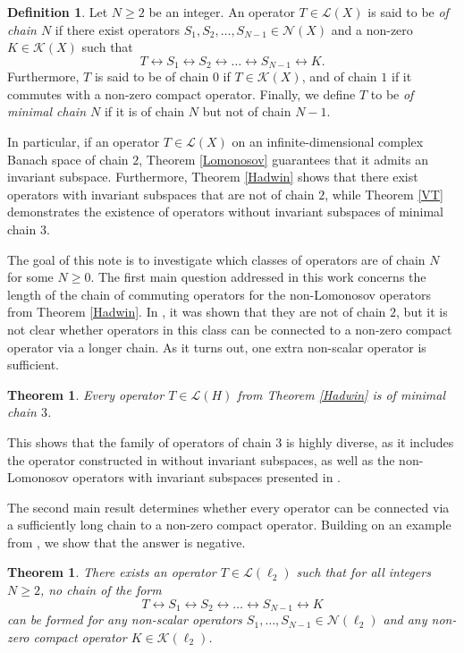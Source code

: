 \documentclass[a4paper,12pt]{article}
\newtheorem{theorem}[thm]{Theorem}
\theoremstyle{definition}
\newtheorem{definition}[thm]{Definition}
\numberwithin{equation}{section}
\numberwithin{thm}{section}
\begin{document}
\begin{definition}
Let $N\geq 2$ be an integer. An operator $T \in \mathcal{L}(X)$ is said to be \textit{of chain $N$} if there exist operators $S_1,S_2,\dots,S_{N-1} \in \mathcal{N}(X)$ and a non-zero $K \in \mathcal{K}(X)$ such that 
$$T \leftrightarrow S_1 \leftrightarrow S_2 \leftrightarrow\dots\leftrightarrow S_{N-1} \leftrightarrow K.$$ 
Furthermore, $T$ is said to be of chain $0$ if $T\in \mathcal{K}(X)$, and of chain $1$ if it commutes with a non-zero compact operator. Finally, we define $T$ to be \textit{of minimal chain $N$} if it is of chain $N$ but not of chain $N-1$.
\end{definition}
In particular, if an operator $T\in \mathcal{L}(X)$ on an infinite-dimensional complex Banach space of chain $2$,  Theorem \ref{Lomonosov} guarantees that it admits an invariant subspace. Furthermore, Theorem \ref{Hadwin} shows that there exist operators with invariant subspaces that are not of chain $2$, while Theorem \ref{VT} demonstrates the existence of operators without invariant subspaces of minimal chain $3$. 

The goal of this note is to investigate which classes of operators are of chain $N$ for some $N\geq 0$. The first main question addressed in this work concerns the length of the chain of commuting operators for the non-Lomonosov operators from Theorem \ref{Hadwin}. In \cite{Hadwin}, it was shown that they are not of chain $2$, but it is not clear whether operators in this class can be connected to a non-zero compact operator via a longer chain. As it turns out, one extra non-scalar operator is sufficient.

\begin{theorem}
\label{non-LomonosovChain3}
Every operator $T\in \mathcal{L}(H)$ from Theorem \ref{Hadwin} is of minimal chain $3$.
\end{theorem}

This shows that the family of operators of chain $3$ is highly diverse, as it includes the operator constructed in \cite{Read1986} without invariant subspaces, as well as the non-Lomonosov operators with invariant subspaces presented in \cite{Hadwin}.

The second main result determines whether every operator can be connected via a sufficiently long chain to a non-zero compact operator. Building on an example from \cite{Ambrozie}, we show that the answer is negative.

\begin{theorem}
\label{NoCompactAmbrozie}
There exists an operator $T\in \mathcal{L}(\ell_2)$ such that for all integers $N\geq 2$, no chain of the form
$$T \leftrightarrow S_1 \leftrightarrow S_2 \leftrightarrow\dots \leftrightarrow S_{N-1} \leftrightarrow K$$
can be formed for any non-scalar operators $S_1,\dots,S_{N-1}\in \mathcal{N}(\ell_2)$ and any non-zero compact operator $K\in \mathcal{K}(\ell_2)$.
\end{theorem}
\end{document}
